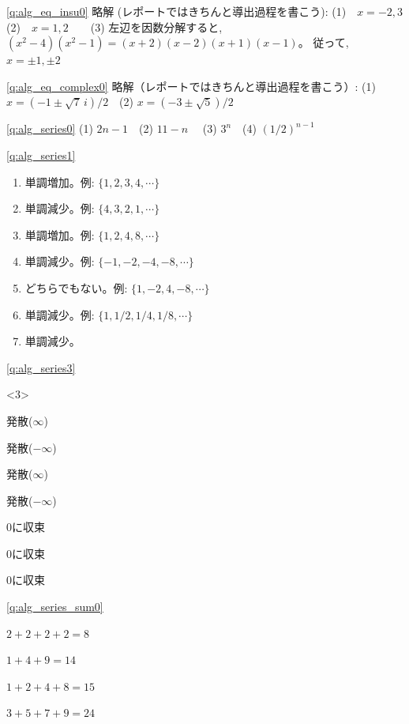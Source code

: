 \ref{q:alg_eq_insu0} 略解 (レポートではきちんと導出過程を書こう):
(1)　$x=-2,3$　　(2)　$x=1,2$　　(3) 左辺を因数分解すると, $(x^2-4)(x^2-1)=(x+2)(x-2)(x+1)(x-1)$。
従って, $x=\pm1, \pm2$
\mv




\ref{q:alg_eq_complex0} 略解（レポートではきちんと導出過程を書こう）:
(1) $x=(-1 \pm \sqrt{7}\,i)/2$　(2) $x=(-3 \pm \sqrt{5})/2$
\mv


\ref{q:alg_series0} (1) $2n -1$　(2) $11 -n$　
(3) $3^n$　(4) $(1/2)^{n-1}$\mv


\ref{q:alg_series1} 
\begin{enumerate}
\item 単調増加。例: $\{1,2,3,4,\cdots\}$
\item 単調減少。例: $\{4,3,2,1,\cdots\}$
\item 単調増加。例: $\{1,2,4,8,\cdots\}$
\item 単調減少。例: $\{-1,-2,-4,-8,\cdots\}$
\item どちらでもない。例: $\{1,-2,4,-8,\cdots\}$
\item 単調減少。例: $\{1,1/2,1/4,1/8,\cdots\}$
\item 単調減少。
\end{enumerate}
\mv


\ref{q:alg_series3} 
\begin{edaenumerate}
<3>
\item 発散($\infty$)
\item 発散($-\infty$)
\item 発散($\infty$)
\item 発散($-\infty$)
\item 0に収束
\item 0に収束
\item 0に収束
\end{edaenumerate}
\mv


\ref{q:alg_series_sum0} 
\begin{edaenumerate}
\item $2+2+2+2=8$
\item $1+4+9=14$
\item $1+2+4+8=15$
\item $3+5+7+9=24$
\end{edaenumerate}
\mv

